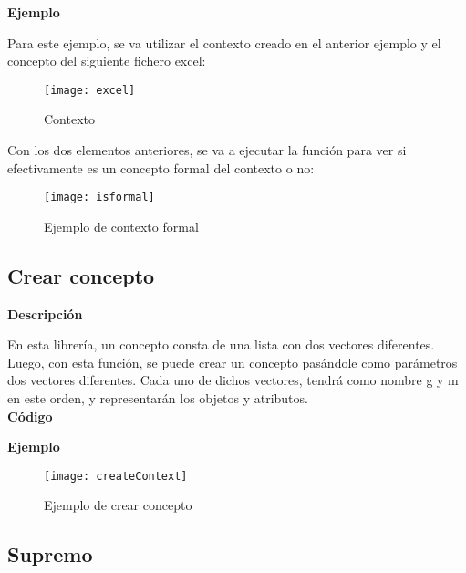        \bigskip

        \textbf{Ejemplo}

        Para este ejemplo, se va utilizar el contexto creado en el anterior ejemplo y el concepto del siguiente fichero excel:

        \begin{figure}[H]
            \centering
            \texttt{[image: excel]}
            \caption{Contexto}
            \label{fig:excel}
        \end{figure}


        Con los dos elementos anteriores, se va a ejecutar la funci\'on para ver si efectivamente es un concepto formal del contexto o no:

        \begin{figure}[H]
            \centering
            \texttt{[image: isformal]}
            \caption{Ejemplo de contexto formal}
            \label{fig:isformal}
        \end{figure}

        \clearpage



    \subsection{Crear concepto}

        \textbf{Descripci\'on}

        En esta librer\'ia, un concepto consta de una lista con dos vectores diferentes. Luego, con esta funci\'on, se puede crear un concepto 
        pas\'andole como par\'ametros dos vectores diferentes.
        Cada uno de dichos vectores, tendr\'a como nombre g y m en este orden, y representar\'an los objetos y atributos.
        \\
        

        \textbf{C\'odigo}

        

        \bigskip

        \textbf{Ejemplo}

        \begin{figure}[H]
            \centering
            \texttt{[image: createContext]}
            \caption{Ejemplo de crear concepto}
            \label{fig:createContext}
        \end{figure}




    \subsection{Supremo}


